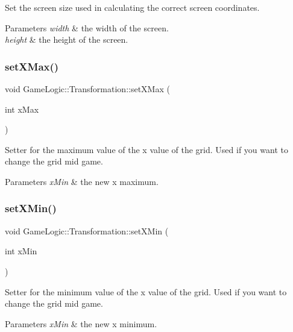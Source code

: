 Set the screen size used in calculating the correct screen coordinates. 
\begin{DoxyParams}{Parameters}
{\em width} & the width of the screen. \\
\hline
{\em height} & the height of the screen. \\
\hline
\end{DoxyParams}
\mbox{\label{classGameLogic_1_1Transformation_ac1818769a0212075fb865d0495ced12c}} 
\subsubsection{\texorpdfstring{set\+X\+Max()}{setXMax()}}
{\footnotesize\ttfamily void Game\+Logic\+::\+Transformation\+::set\+X\+Max (\begin{DoxyParamCaption}\item[{int}]{x\+Max }\end{DoxyParamCaption})}

Setter for the maximum value of the x value of the grid. Used if you want to change the grid mid game. 
\begin{DoxyParams}{Parameters}
{\em x\+Min} & the new x maximum. \\
\hline
\end{DoxyParams}
\mbox{\label{classGameLogic_1_1Transformation_a69686d5a12ba0e04b6ea7b80e5c874ac}} 
\subsubsection{\texorpdfstring{set\+X\+Min()}{setXMin()}}
{\footnotesize\ttfamily void Game\+Logic\+::\+Transformation\+::set\+X\+Min (\begin{DoxyParamCaption}\item[{int}]{x\+Min }\end{DoxyParamCaption})}

Setter for the minimum value of the x value of the grid. Used if you want to change the grid mid game. 
\begin{DoxyParams}{Parameters}
{\em x\+Min} & the new x minimum. \\
\hline
\end{DoxyParams}
\mbox{\label{classGameLogic_1_1Transformation_a0da7509d874b735240aba51c72f31811}} 
